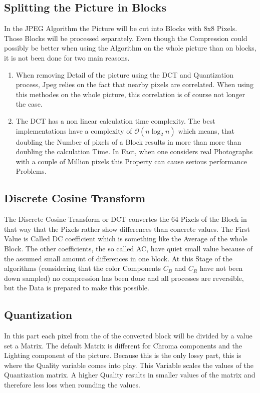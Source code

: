 \documentclass{scrartcl}
\begin{document}
\subsection{Splitting the Picture in Blocks}
In the JPEG Algorithm the Picture will be cut into Blocks with 8x8 Pixels. Those Blocks will be processed separately. Even though the Compression could possibly be better when using the Algorithm on the whole picture than on blocks, it is not been done for two main reasons.
\begin{enumerate}
\item When removing Detail of the picture using the DCT and Quantization process, Jpeg relies on the fact that nearby pixels are correlated. When using this methodes on the whole picture, this correlation is of course not longer the case.
\item The DCT has a non linear calculation time complexity. The best implementations have a complexity of $ \mathcal{O}(n \log_2 n) $ which means, that doubling the Number of pixels of a Block results in more than more than doubling the calculation Time. In Fact, when one considers real Photographs with a couple of Million pixels this Property can cause serious performance Problems.
\end{enumerate}

\subsection{Discrete Cosine Transform}
The Discrete Cosine Transform or DCT convertes the 64 Pixels of the Block in that way that the Pixels rather show differences than concrete values. The First Value is Called DC coefficient which is something like the Average of the whole Block. The other coefficients, the so called AC, have quiet small value because of the assumed small amount of differences in one block. At this Stage of the algorithms (considering that the color Components $ C_B $ and $ C_R $ have not been down sampled) no compression has been done and all processes are reversible, but the Data is prepared to make this possible.

\subsection{Quantization}
In this part each pixel from the of the converted block will be divided by a value set a Matrix. The default Matrix is different for Chroma components and the Lighting component of the picture. Because this is the only lossy part, this is where the Quality variable comes into play. This Variable scales the values of the Quantization matrix. A higher Quality results in smaller values of the matrix and therefore less loss when rounding the values.
\end{document}
